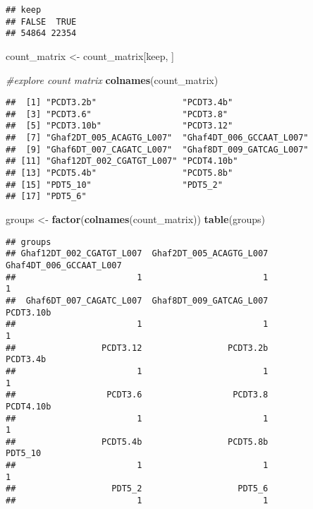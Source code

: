 \documentclass[]{article}
\newenvironment{Shaded}{\begin{snugshade}}{\end{snugshade}}
\newcommand{\CommentTok}[1]{\textcolor[rgb]{0.56,0.35,0.01}{\textit{#1}}}
\newcommand{\KeywordTok}[1]{\textcolor[rgb]{0.13,0.29,0.53}{\textbf{#1}}}
\newcommand{\NormalTok}[1]{#1}
\newcommand{\StringTok}[1]{\textcolor[rgb]{0.31,0.60,0.02}{#1}}
\begin{document}
\begin{verbatim}
## keep
## FALSE  TRUE 
## 54864 22354
\end{verbatim}

\begin{Shaded}
\begin{Highlighting}[]
\NormalTok{count_matrix <-}\StringTok{ }\NormalTok{count_matrix[keep, ]}

\CommentTok{#explore count matrix}
\KeywordTok{colnames}\NormalTok{(count_matrix)}
\end{Highlighting}
\end{Shaded}

\begin{verbatim}
##  [1] "PCDT3.2b"                 "PCDT3.4b"                
##  [3] "PCDT3.6"                  "PCDT3.8"                 
##  [5] "PCDT3.10b"                "PCDT3.12"                
##  [7] "Ghaf2DT_005_ACAGTG_L007"  "Ghaf4DT_006_GCCAAT_L007" 
##  [9] "Ghaf6DT_007_CAGATC_L007"  "Ghaf8DT_009_GATCAG_L007" 
## [11] "Ghaf12DT_002_CGATGT_L007" "PCDT4.10b"               
## [13] "PCDT5.4b"                 "PCDT5.8b"                
## [15] "PDT5_10"                  "PDT5_2"                  
## [17] "PDT5_6"
\end{verbatim}

\begin{Shaded}
\begin{Highlighting}[]
\NormalTok{groups <-}\StringTok{ }\KeywordTok{factor}\NormalTok{(}\KeywordTok{colnames}\NormalTok{(count_matrix))}
\KeywordTok{table}\NormalTok{(groups)}
\end{Highlighting}
\end{Shaded}

\begin{verbatim}
## groups
## Ghaf12DT_002_CGATGT_L007  Ghaf2DT_005_ACAGTG_L007  Ghaf4DT_006_GCCAAT_L007 
##                        1                        1                        1 
##  Ghaf6DT_007_CAGATC_L007  Ghaf8DT_009_GATCAG_L007                PCDT3.10b 
##                        1                        1                        1 
##                 PCDT3.12                 PCDT3.2b                 PCDT3.4b 
##                        1                        1                        1 
##                  PCDT3.6                  PCDT3.8                PCDT4.10b 
##                        1                        1                        1 
##                 PCDT5.4b                 PCDT5.8b                  PDT5_10 
##                        1                        1                        1 
##                   PDT5_2                   PDT5_6 
##                        1                        1
\end{verbatim}
\end{document}
